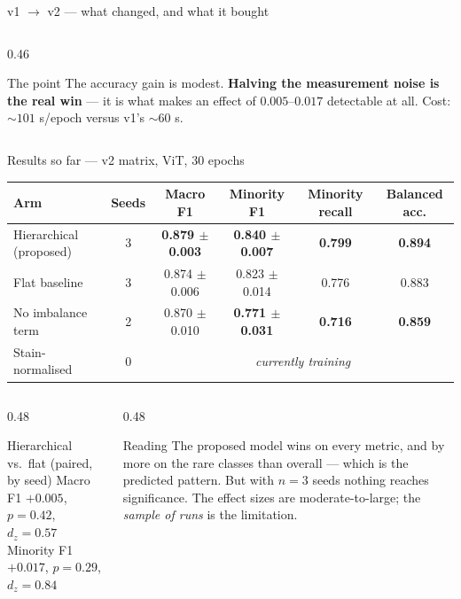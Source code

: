 \documentclass[aspectratio=169,11pt]{beamer}
\newcommand{\good}[1]{\textcolor{green!45!black}{\textbf{#1}}}
\newcommand{\bad}[1]{\textcolor{red!70!black}{\textbf{#1}}}
\begin{document}
\begin{frame}{v1 $\rightarrow$ v2 --- what changed, and what it bought}
\begin{columns}[T]
\begin{column}{0.46\textwidth}
      \medskip
      \begin{exampleblock}{The point}
        \scriptsize
        The accuracy gain is modest. \textbf{Halving the measurement noise is
        the real win} --- it is what makes an effect of $0.005$--$0.017$
        detectable at all. Cost: ${\sim}101$ s/epoch versus v1's ${\sim}60$ s.
      \end{exampleblock}
    \end{column}
  \end{columns}
\end{frame}

\begin{frame}{Results so far --- v2 matrix, ViT, 30 epochs}
  \centering
  \small
  \begin{tabular}{@{}lccccc@{}}
    \toprule
    \textbf{Arm} & \textbf{Seeds} & \textbf{Macro F1} & \textbf{Minority F1}
      & \textbf{Minority recall} & \textbf{Balanced acc.} \\
    \midrule
    Hierarchical (proposed) & 3 & \good{0.879 $\pm$ 0.003} & \good{0.840 $\pm$ 0.007} & \good{0.799} & \good{0.894} \\
    Flat baseline           & 3 & 0.874 $\pm$ 0.006 & 0.823 $\pm$ 0.014 & 0.776 & 0.883 \\
    No imbalance term       & 2 & 0.870 $\pm$ 0.010 & \bad{0.771 $\pm$ 0.031} & \bad{0.716} & \bad{0.859} \\
    Stain-normalised        & 0 & \multicolumn{4}{c}{\emph{currently training}} \\
    \bottomrule
  \end{tabular}

  \vspace{0.8em}
  \begin{columns}[T]
    \begin{column}{0.48\textwidth}
      \begin{exampleblock}{Hierarchical vs.\ flat (paired, by seed)}
        \small
        Macro F1 \quad $+0.005$, \; $p = 0.42$, \; $d_z = 0.57$ \\
        Minority F1 \; $+0.017$, \; $p = 0.29$, \; $d_z = 0.84$
      \end{exampleblock}
    \end{column}
    \begin{column}{0.48\textwidth}
      \begin{alertblock}{Reading}
        \small
        The proposed model wins on every metric, and by more on the rare
        classes than overall --- which is the predicted pattern. But with
        $n = 3$ seeds nothing reaches significance. The effect sizes are
        moderate-to-large; the \emph{sample of runs} is the limitation.
      \end{alertblock}
    \end{column}
  \end{columns}
\end{frame}
\end{document}
